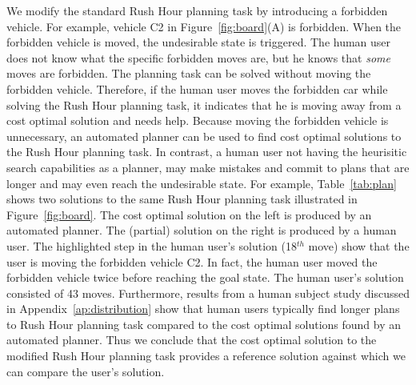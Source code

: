 We modify the standard Rush Hour planning task by introducing a forbidden vehicle. 
For example, vehicle C2 in Figure~\ref{fig:board}(A) is forbidden. 
When the forbidden vehicle is moved, the undesirable state is triggered.
The human user does not know what the specific forbidden moves are, but he knows that \textit{some} moves are forbidden.
The planning task can be solved without moving the forbidden vehicle.
Therefore, if the human user moves the forbidden car while solving the Rush Hour planning task, it indicates that he is moving away from a cost optimal solution and needs help.
Because moving the forbidden vehicle is unnecessary, an automated planner can be used to find cost optimal solutions to the Rush Hour planning task.
In contrast, a human user not having the heurisitic search capabilities as a planner, may make mistakes and commit to plans that are longer and may even reach the undesirable state.
For example, Table~\ref{tab:plan} shows two solutions to the same Rush Hour planning task illustrated in Figure~\ref{fig:board}.
The cost optimal solution on the left is produced by an automated planner. 
The (partial) solution on the right is produced by a human user. 
The highlighted step in the human user's solution (18$^{th}$ move) show that the user is moving the forbidden vehicle C2. 
In fact, the human user moved the forbidden vehicle twice before reaching the goal state.
The human user's solution consisted of 43 moves.
Furthermore, results from a human subject study discussed in Appendix~\ref{ap:distribution} show that human users typically find longer plans to Rush Hour planning task compared to the cost optimal solutions found by an automated planner.
Thus we conclude that the cost optimal solution to the modified Rush Hour planning task provides a reference solution against which we can compare the user’s solution.

